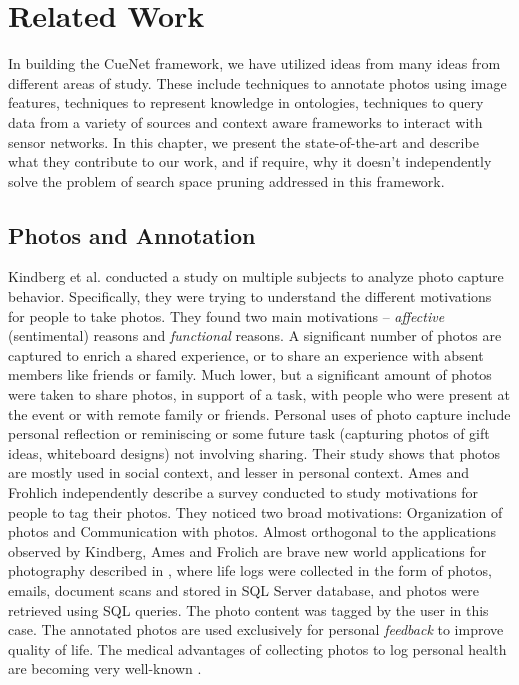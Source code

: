 \chapter{Related Work}

In building the CueNet framework, we have utilized ideas from many ideas from different areas of study. These include techniques to annotate photos using image features, techniques to represent knowledge in ontologies, techniques to query data from a variety of sources and context aware frameworks to interact with sensor networks. In this chapter, we present the state-of-the-art and describe what they contribute to our work, and if require, why it doesn't independently solve the problem of search space pruning addressed in this framework.

\section{Photos and Annotation}

Kindberg et al. \cite{kindberg2005ubiquitous} conducted a study on multiple subjects to analyze photo capture behavior. Specifically, they were trying to understand the different motivations for people to take photos. They found two main motivations -- \textit{affective} (sentimental) reasons and \textit{functional} reasons. A significant number of photos are captured to enrich a shared experience, or to share an experience with absent members like friends or family. Much lower, but a significant amount of photos were taken to share photos, in support of a task, with people who were present at the event or with remote family or friends. Personal uses of photo capture include personal reflection or reminiscing or some future task (capturing photos of gift ideas, whiteboard designs) not involving sharing. Their study shows that photos are mostly used in social context, and lesser in personal context. Ames \cite{ames2007we} and Frohlich \cite{frohlich2002requirements} independently describe a survey conducted to study motivations for people to tag their photos. They noticed two broad motivations: Organization of photos and Communication with photos. Almost orthogonal to the applications observed by Kindberg, Ames and Frolich are brave new world applications for photography described in \cite{gemmell2002mylifebits, dumais2003stuff}, where life logs were collected in the form of photos, emails, document scans and stored in SQL Server database, and photos were retrieved using SQL queries. The photo content was tagged by the user in this case. The annotated photos are used exclusively for personal \textit{feedback} to improve quality of life. The medical advantages of collecting photos to log personal health are becoming very well-known \cite{bell2010total}.

